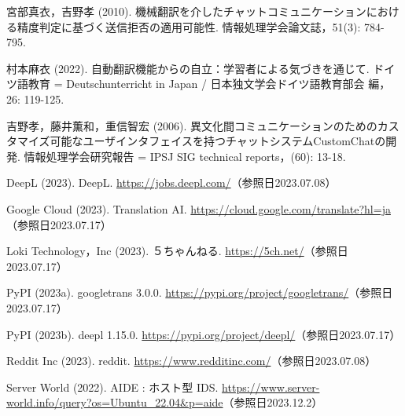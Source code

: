 \documentclass[b5paper,12pt]{jsreport}
\begin{document}
\begin{thebibliography}{99}
宮部真衣，吉野孝 (2010). 機械翻訳を介したチャットコミュニケーションにおける精度判定に基づく送信拒否の適用可能性. 情報処理学会論文誌，51(3): 784-795.

村本麻衣 (2022). 自動翻訳機能からの自立：学習者による気づきを通じて. ドイツ語教育 = Deutschunterricht in Japan / 日本独文学会ドイツ語教育部会 編，26: 119-125.

吉野孝，藤井薫和，重信智宏 (2006). 異文化間コミュニケーションのためのカスタマイズ可能なユーザインタフェイスを持つチャットシステムCustomChatの開発. 情報処理学会研究報告 = IPSJ SIG technical reports，(60): 13-18.

DeepL (2023). DeepL. \url{https://jobs.deepl.com/}（参照日2023.07.08）

Google Cloud (2023). Translation AI. \url{https://cloud.google.com/translate?hl=ja}（参照日2023.07.17）

Loki Technology，Inc (2023). ５ちゃんねる. \url{https://5ch.net/}（参照日2023.07.17）

PyPI (2023a). googletrans 3.0.0. \url{https://pypi.org/project/googletrans/}（参照日2023.07.17）

PyPI (2023b). deepl 1.15.0. \url{https://pypi.org/project/deepl/}（参照日2023.07.17）

Reddit Inc (2023). reddit. \url{https://www.redditinc.com/}（参照日2023.07.08）

Server World (2022). AIDE : ホスト型 IDS. \url{https://www.server-world.info/query?os=Ubuntu_22.04&p=aide}（参照日2023.12.2）

\end{thebibliography}
    
\end{document}
